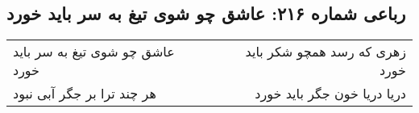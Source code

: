 \begin{center}
\section*{رباعی شماره ۲۱۶: عاشق چو شوی تیغ به سر باید خورد}
\label{sec:sh216}
\begin{longtable}{l p{0.5cm} r}
عاشق چو شوی تیغ به سر باید خورد
&&
زهری که رسد همچو شکر باید خورد
\\
هر چند ترا بر جگر آبی نبود
&&
دریا دریا خون جگر باید خورد
\\
\end{longtable}
\end{center}
